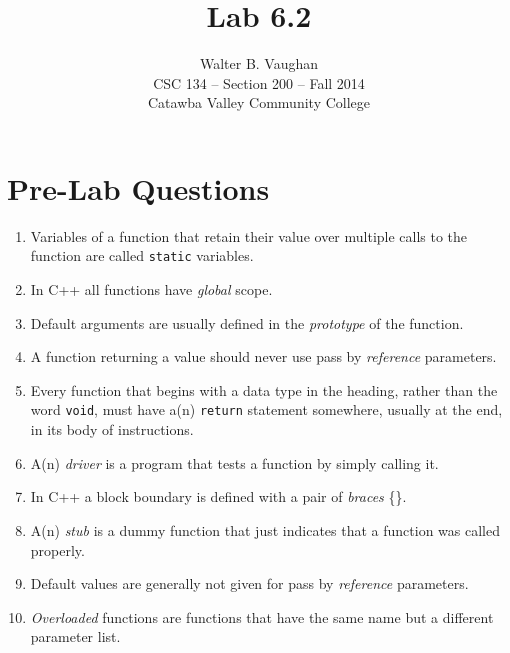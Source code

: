 \documentclass[11pt]{article}
\author{Walter B. Vaughan\\
        \small CSC 134 -- Section 200 -- Fall 2014\\
        \small Catawba Valley Community College}
\title{Lab 6.2}
\date{\vspace{-5ex}}
\begin{document}
\maketitle


\section*{Pre-Lab Questions}
\begin{enumerate}
    \item Variables of a function that retain their value over multiple calls to the function are called \lstinline{static} variables.
    \item In C++ all functions have \emph{global} scope.
    \item Default arguments are usually defined in the \emph{prototype} of the function.
    \item A function returning a value should never use pass by \emph{reference} parameters.
    \item Every function that begins with a data type in the heading, rather than the word \lstinline{void}, must have a(n) \lstinline{return} statement somewhere, usually at the end, in its body of instructions.
    \item A(n) \emph{driver} is a program that tests a function by simply calling it.
    \item In C++ a block boundary is defined with a pair of \emph{braces} \{\}.
    \item A(n) \emph{stub} is a dummy function that just indicates that a
function was called properly.
    \item Default values are generally not given for pass by \emph{reference} parameters.
    \item \emph{Overloaded} functions are functions that have the same name but a different parameter list.

\end{enumerate}
\end{document}
